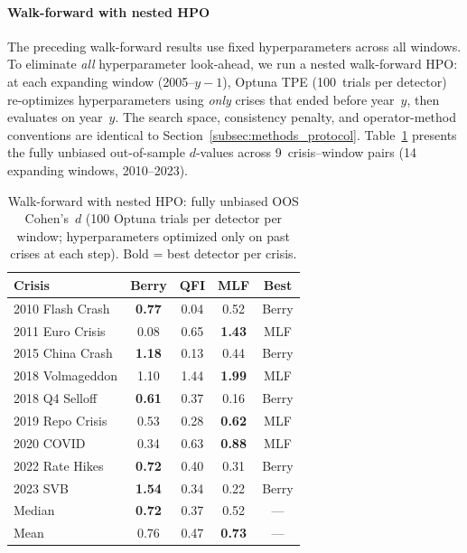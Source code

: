 \documentclass[3p]{elsarticle}
\begin{document}
\paragraph{Walk-forward with nested HPO}
The preceding walk-forward results use fixed hyperparameters across all
windows.  To eliminate \emph{all} hyperparameter look-ahead, we run a
nested walk-forward HPO: at each expanding window (2005--$y{-}1$),
Optuna TPE (100~trials per detector) re-optimizes hyperparameters using
\emph{only} crises that ended before year~$y$, then evaluates on
year~$y$.  The search space, consistency penalty, and operator-method
conventions are identical to
Section~\ref{subsec:methods_protocol}.  Table~\ref{tab:wf_hpo}
presents the fully unbiased out-of-sample $d$-values across 9~crisis--window
pairs (14 expanding windows, 2010--2023).

\begin{table}[htb]
\centering
\caption{Walk-forward with nested HPO: fully unbiased OOS Cohen's~$d$
  (100 Optuna trials per detector per window; hyperparameters optimized
  only on past crises at each step).  Bold = best detector per crisis.}
\label{tab:wf_hpo}
\small
\begin{tabular}{lcccc}
\toprule
Crisis & Berry & QFI & MLF & Best \\
\midrule
2010 Flash Crash      & \textbf{0.77} & 0.04 & 0.52 & Berry \\
2011 Euro Crisis      & 0.08 & 0.65 & \textbf{1.43} & MLF \\
2015 China Crash      & \textbf{1.18} & 0.13 & 0.44 & Berry \\
2018 Volmageddon      & 1.10 & 1.44 & \textbf{1.99} & MLF \\
2018 Q4 Selloff       & \textbf{0.61} & 0.37 & 0.16 & Berry \\
2019 Repo Crisis      & 0.53 & 0.28 & \textbf{0.62} & MLF \\
2020 COVID            & 0.34 & 0.63 & \textbf{0.88} & MLF \\
2022 Rate Hikes       & \textbf{0.72} & 0.40 & 0.31 & Berry \\
2023 SVB              & \textbf{1.54} & 0.34 & 0.22 & Berry \\
\midrule
Median                & \textbf{0.72} & 0.37 & 0.52 & --- \\
Mean                  & 0.76 & 0.47 & \textbf{0.73} & --- \\
\bottomrule
\end{tabular}

\medskip
{}
\end{table}
\end{document}
